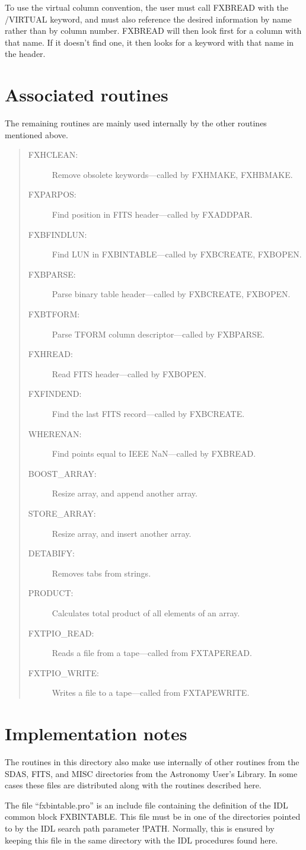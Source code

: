To use the virtual column convention, the user must call FXBREAD with the
/VIRTUAL keyword, and must also reference the desired information by name
rather than by column number.  FXBREAD will then look first for a column with
that name.  If it doesn't find one, it then looks for a keyword with that name
in the header.

\section{Associated routines}

The remaining routines are mainly used internally by the other routines
mentioned above.
\begin{quote}
\begin{description}
\item[FXHCLEAN:]
Remove obsolete keywords---called by FXHMAKE, FXHBMAKE.
\item[FXPARPOS:]
Find position in FITS header---called by FXADDPAR.
\item[FXBFINDLUN:]
Find LUN in FXBINTABLE---called by FXBCREATE, FXBOPEN.
\item[FXBPARSE:]
Parse binary table header---called by FXBCREATE, FXBOPEN.
\item[FXBTFORM:]
Parse TFORM column descriptor---called by FXBPARSE.
\item[FXHREAD:]
Read FITS header---called by FXBOPEN.
\item[FXFINDEND:]
Find the last FITS record---called by FXBCREATE.
\item[WHERENAN:]
Find points equal to IEEE NaN---called by FXBREAD.
\item[BOOST\_ARRAY:]
Resize array, and append another array.
\item[STORE\_ARRAY:]
Resize array, and insert another array.
\item[DETABIFY:]
Removes tabs from strings.
\item[PRODUCT:]
Calculates total product of all elements of an array.
\item[FXTPIO\_READ:]
Reads a file from a tape---called from FXTAPEREAD.
\item[FXTPIO\_WRITE:]
Writes a file to a tape---called from FXTAPEWRITE.
\end{description}
\end{quote}

\section{Implementation notes}

The routines in this directory also make use internally of other routines from
the SDAS, FITS, and MISC directories from the Astronomy User's Library.  In
some cases these files are distributed along with the routines described here.

The file ``fxbintable.pro'' is an include file containing the definition of the
IDL common block FXBINTABLE.  This file must be in one of the directories
pointed to by the IDL search path parameter !PATH\@.  Normally, this is ensured
by keeping this file in the same directory with the IDL procedures found here.


